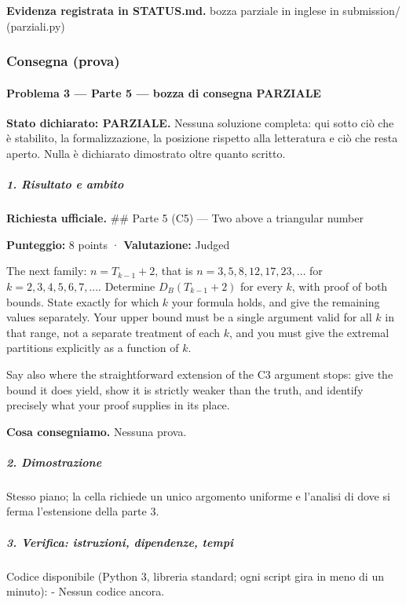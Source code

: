 \documentclass[11pt,a4paper]{article}
\begin{document}
\textbf{Evidenza registrata in STATUS.md.} bozza parziale in inglese in submission/ (parziali.py)

\subsubsection{Consegna (prova)}
\paragraph{Problema 3 --- Parte 5 --- bozza di consegna
PARZIALE}\label{problema-3-parte-5-bozza-di-consegna-parziale}

\textbf{Stato dichiarato: PARZIALE.} Nessuna soluzione completa: qui
sotto ciò che è stabilito, la formalizzazione, la posizione rispetto
alla letteratura e ciò che resta aperto. Nulla è dichiarato dimostrato
oltre quanto scritto.

\subparagraph{1. Risultato e ambito}\label{risultato-e-ambito}

\textbf{Richiesta ufficiale.} \#\# Parte 5 (C5) --- Two above a
triangular number

\textbf{Punteggio:} 8 points · \textbf{Valutazione:} Judged

The next family: \(n = T_{k-1} + 2\), that is
\(n = 3, 5, 8, 12, 17, 23, \ldots\) for
\(k = 2, 3, 4, 5, 6, 7, \ldots\). Determine \(D_B(T_{k-1} + 2)\) for
every \(k\), with proof of both bounds. State exactly for which \(k\)
your formula holds, and give the remaining values separately. Your upper
bound must be a single argument valid for all \(k\) in that range, not a
separate treatment of each \(k\), and you must give the extremal
partitions explicitly as a function of \(k\).

Say also where the straightforward extension of the C3 argument stops:
give the bound it does yield, show it is strictly weaker than the truth,
and identify precisely what your proof supplies in its place.

\textbf{Cosa consegniamo.} Nessuna prova.

\subparagraph{2. Dimostrazione}\label{dimostrazione}

Stesso piano; la cella richiede un unico argomento uniforme e l'analisi
di dove si ferma l'estensione della parte 3.

\subparagraph{3. Verifica: istruzioni, dipendenze,
tempi}\label{verifica-istruzioni-dipendenze-tempi}

Codice disponibile (Python 3, libreria standard; ogni script gira in
meno di un minuto): - Nessun codice ancora.
\end{document}
